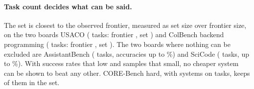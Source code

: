 \documentclass[11pt]{article}
\begin{document}
\paragraph{Task count decides what can be said.}
The set is closest to the observed frontier, measured as set size over frontier size, on the two boards USACO (\NumUsacoTasks{} tasks: frontier \NumUsacoFrontier, set \NumUsacoSet) and ColBench backend programming (\NumColbenchBackendProgrammingTasks{} tasks: frontier \NumColbenchBackendProgrammingFrontier, set \NumColbenchBackendProgrammingSet). The two boards where nothing can be excluded are AssistantBench (\NumAssistantbenchTasks{} tasks, accuracies up to \NumAssistantbenchTopAcc\%) and SciCode (\NumScicodeTasks{} tasks, up to \NumScicodeTopAcc\%). With success rates that low and samples that small, no cheaper system can be shown to beat any other. CORE-Bench hard, with \NumCorebenchHardSystems{} systems on \NumCorebenchHardTasks{} tasks, keeps \NumCorebenchHardSet{} of them in the set.
\end{document}
